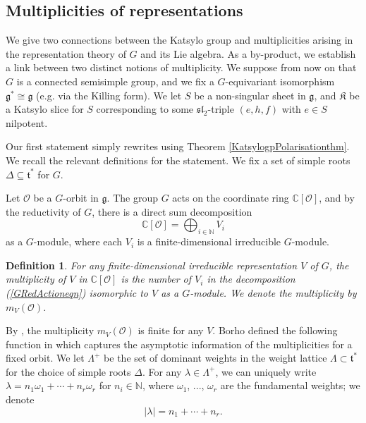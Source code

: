 \documentclass{amsart}
\newtheorem{definition}[theorem]{Definition}
\theoremstyle{remark}
\numberwithin{theorem}{section}
\numberwithin{equation}{section}
\begin{document}
\subsection{Multiplicities of representations}\label{Multiplicitiessbn}
We give two connections between the Katsylo group and multiplicities arising in the representation theory of $G$ and its Lie algebra. As a by-product, we establish a link between two distinct notions of multiplicity. We suppose from now on that $G$ is a connected semisimple group, and we fix a $G$-equivariant isomorphism $\mathfrak{g}^* \cong \mathfrak{g}$ (e.g. via the Killing form). We let $S$ be a non-singular sheet in $\mathfrak{g}$, and $\mathfrak{K}$ be a Katsylo slice for $S$ corresponding to some $\mathfrak{sl}_2$-triple $(e,h,f)$ with $e \in S$ nilpotent.

Our first statement simply rewrites \cite[Theorem 7.2]{BK} using Theorem \ref{KatsylogpPolarisationthm}. We recall the relevant definitions for the statement. We fix a set of simple roots $\Delta \subseteq \mathfrak{t}^*$ for $G$.

 Let $\mathcal O$ be a $G$-orbit in $\mathfrak{g}$. The group $G$ acts on the coordinate ring $\mathbb{C}[\mathcal O]$, and by the reductivity of $G$, there is a direct sum decomposition
\begin{equation}\label{GRedActioneqn}
    \mathbb{C}[\mathcal O] = \bigoplus_{i \in \mathbb{N}} V_i
\end{equation}
as a $G$-module, where each $V_i$ is a finite-dimensional irreducible $G$-module.

\begin{definition}\label{VMultiplicitydef}
    For any finite-dimensional irreducible representation $V$ of $G$, the \emph{multiplicity of $V$ in $\mathbb{C}[\mathcal O]$} is the number of $V_i$ in the decomposition (\ref{GRedActioneqn}) isomorphic to $V$ as a $G$-module. We denote the multiplicity by $m_V(\mathcal O)$.
\end{definition}

By \cite[Proposition 8]{Kostant}, the multiplicity $m_V(\mathcal O)$ is finite for any $V$. Borho defined the following function in \cite{Borho1} which captures the asymptotic information of the multiplicities for a fixed orbit. We let $\Lambda^+$ be the set of dominant weights in the weight lattice $\Lambda \subset \mathfrak{t}^*$ for the choice of simple roots $\Delta$. For any $\lambda \in \Lambda^+$, we can uniquely write $\lambda = n_1\omega_1 + \cdots + n_r \omega_r$ for $n_i \in \mathbb{N}$, where $\omega_1$, ..., $\omega_r$ are the fundamental weights; we denote
$$|\lambda| = n_1 + \cdots + n_r.$$
\end{document}
